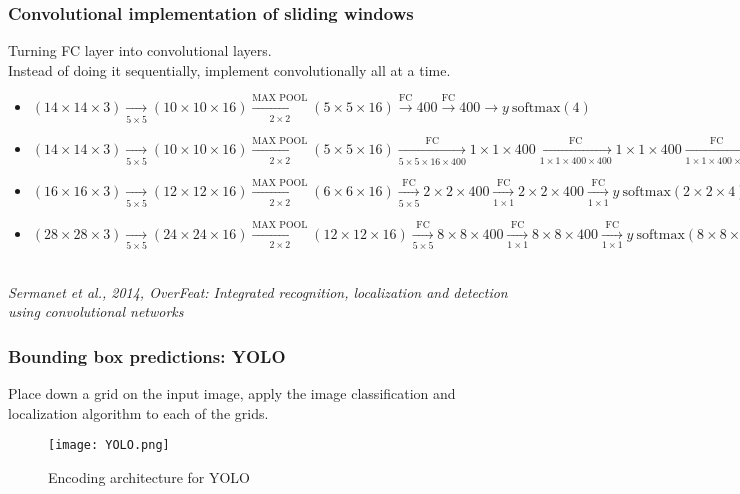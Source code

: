 \subsubsection{Convolutional implementation of sliding windows}
Turning FC layer into convolutional layers.\\
Instead of doing it sequentially, implement convolutionally all at a time.\\
\begin{itemize}
\item
$(14 \times 14 \times 3) \xrightarrow[5 \times 5]{} (10 \times 10 \times 16) \xrightarrow[2 \times 2]{\text{MAX~POOL}} (5 \times 5 \times 16) \xrightarrow[]{\text{FC}} 400 \xrightarrow[]{\text{FC}} 400 \rightarrow y ~ \text{softmax}(4)$
\item
$(14 \times 14 \times 3) \xrightarrow[5 \times 5]{} (10 \times 10 \times 16) \xrightarrow[2 \times 2]{\text{MAX~POOL}} (5 \times 5 \times 16) \xrightarrow[5 \times 5 \times 16 \times 400]{\text{FC}} 1 \times 1 \times 400 \xrightarrow[1 \times 1 \times 400 \times 400]{\text{FC}} 1 \times 1 \times 400 \xrightarrow[1 \times 1 \times 400 \times 4]{\text{FC}}  y ~ \text{softmax}(1\times 1 \times 4)$
\item
$(16 \times 16 \times 3) \xrightarrow[5 \times 5]{} (12 \times 12 \times 16) \xrightarrow[2 \times 2]{\text{MAX~POOL}} (6 \times 6 \times 16) \xrightarrow[5 \times 5]{\text{FC}} 2 \times 2 \times 400 \xrightarrow[1 \times 1]{\text{FC}} 2 \times 2 \times 400 \xrightarrow[1 \times 1]{\text{FC}}  y ~ \text{softmax}(2\times 2 \times 4)$
\item
$(28 \times 28 \times 3) \xrightarrow[5 \times 5]{} (24 \times 24 \times 16) \xrightarrow[2 \times 2]{\text{MAX~POOL}} (12 \times 12 \times 16) \xrightarrow[5 \times 5]{\text{FC}} 8 \times 8 \times 400 \xrightarrow[1 \times 1]{\text{FC}} 8 \times 8 \times 400 \xrightarrow[1 \times 1]{\text{FC}}  y ~ \text{softmax}(8\times 8 \times 4)$
\end{itemize}
~\\
\textit{Sermanet et al., 2014, OverFeat: Integrated recognition, localization and detection using convolutional networks}
\subsubsection{Bounding box predictions: YOLO}
Place down a grid on the input image, apply the image classification and localization algorithm to each of the grids.\\
\begin{figure}[h]
    \centering
    \texttt{[image: YOLO.png]}
    \caption{Encoding architecture for YOLO}
    \label{fig:YOLO}
\end{figure}

